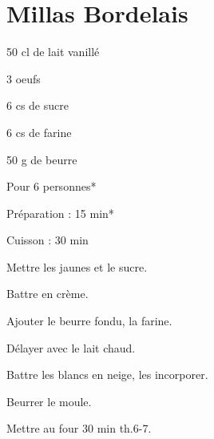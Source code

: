 \section[\normalsize{Millas Bordelais}]{Millas Bordelais}

\begin{ingredients}
\item 50 cl de lait vanill\'e
\item 3 oeufs
\item 6 cs de sucre
\item 6 cs de farine
\item 50 g de beurre
\end{ingredients}
\begin{infos}
\item Pour 6 personnes*
\item Préparation : 15 min*
\item Cuisson : 30 min
\end{infos}
\begin{etapes}
\item Mettre les jaunes et le sucre.
\item Battre en cr\`eme.
\item Ajouter le beurre fondu, la farine.
\item D\'elayer avec le lait chaud.
\item Battre les blancs en neige, les incorporer.
\item Beurrer le moule.
\item Mettre au four 30 min th.6-7.
\end{etapes}
\begin{conseils}
\end{conseils}
